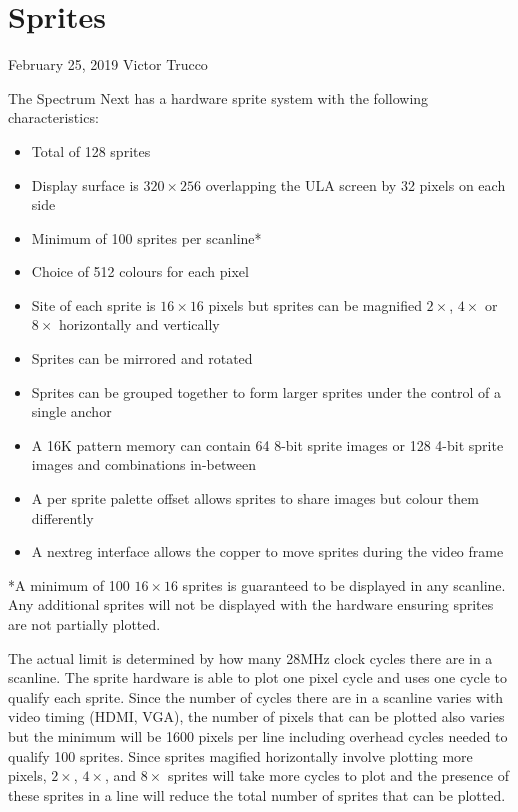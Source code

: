 \section{Sprites}

February 25, 2019  Victor Trucco

The Spectrum Next has a hardware sprite system with the following
characteristics:

\begin{itemize}
\item Total of 128 sprites
\item Display surface is $320\times256$ overlapping the ULA screen by
  32 pixels on each side
\item Minimum of 100 sprites per scanline*
\item Choice of 512 colours for each pixel
\item Site of each sprite is $16\times16$ pixels but sprites can be
  magnified $2\times$, $4\times$ or $8\times$ horizontally and
  vertically
\item Sprites can be mirrored and rotated
\item Sprites can be grouped together to form larger sprites under the
  control of a single anchor
\item A 16K pattern memory can contain 64 8-bit sprite images or 128
  4-bit sprite images and combinations in-between
\item A per sprite palette offset allows sprites to share images but
  colour them differently
\item A nextreg interface allows the copper to move sprites during the
  video frame
\end{itemize}

*A minimum of 100 $16\times16$ sprites is guaranteed to be displayed
in any scanline. Any additional sprites will not be displayed with the
hardware ensuring sprites are not partially plotted.

The actual limit is determined by how many 28MHz clock cycles there
are in a scanline. The sprite hardware is able to plot one pixel cycle
and uses one cycle to qualify each sprite. Since the number of cycles
there are in a scanline varies with video timing (HDMI, VGA), the
number of pixels that can be plotted also varies but the minimum will
be 1600 pixels per line including overhead cycles needed to qualify
100 sprites. Since sprites magified horizontally involve plotting more
pixels, $2\times$, $4\times$, and $8\times$ sprites will take more
cycles to plot and the presence of these sprites in a line will reduce
the total number of sprites that can be plotted.

